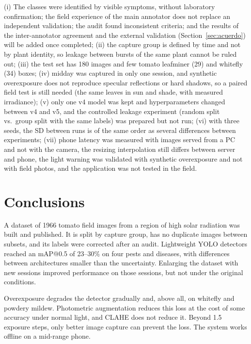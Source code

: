\documentclass[sensors,article,submit,pdftex,moreauthors]{Definitions/mdpi}
\begin{document}
{\color{blue} (i) The classes were identified by visible symptoms, without laboratory confirmation; the field experience of the main annotator does not replace an independent validation; the audit found inconsistent criteria; and the results of the inter-annotator agreement and the external validation (Section~\ref{sec:acuerdo}) will be added once completed;} {\color{blue} (ii) the capture group is defined by time and not by plant identity, so leakage between bursts of the same plant cannot be ruled out;} {\color{blue} (iii) the test set has 180 images and few tomato leafminer (29) and whitefly (34) boxes;} {\color{blue} (iv) midday was captured in only one session, and synthetic overexposure does not reproduce specular reflections or hard shadows, so a paired field test is still needed (the same leaves in sun and shade, with measured irradiance);} {\color{blue} (v) only one v4 model was kept and hyperparameters changed between v4 and v5, and the controlled leakage experiment (random split vs.\ group split with the same labels) was prepared but not run;} {\color{blue} (vi) with three seeds, the SD between runs is of the same order as several differences between experiments;} {\color{blue} (vii) phone latency was measured with images served from a PC and not with the camera, the resizing interpolation still differs between server and phone, the light warning was validated with synthetic overexposure and not with field photos, and the application was not tested in the field.}

\section{Conclusions}

{\color{blue} A dataset of 1966 tomato field images from a region of high solar radiation was built and published.} {\color{blue} It is split by capture group, has no duplicate images between subsets, and its labels were corrected after an audit.} {\color{blue} Lightweight YOLO detectors reached an mAP@0.5 of 23--30\% on four pests and diseases, with differences between architectures smaller than the uncertainty.} {\color{blue} Enlarging the dataset with new sessions improved performance on those sessions, but not under the original conditions.}

{\color{blue} Overexposure degrades the detector gradually and, above all, on whitefly and powdery mildew.} {\color{blue} Photometric augmentation reduces this loss at the cost of some accuracy under normal light, and CLAHE does not reduce it.} {\color{blue} Beyond 1.5 exposure steps, only better image capture can prevent the loss.} {\color{blue} The system works offline on a mid-range phone.}
\end{document}
